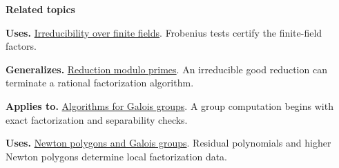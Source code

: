 \documentclass[11pt,a4paper,oneside,openany]{book}
\begin{document}
\par\medskip\begingroup\footnotesize\setlength{\parskip}{1pt}\textbf{\sffamily\color{atlasgreen}Related topics}\par
\color{black}\textbf{Uses.} \hyperlink{article:finite-field-irreducibility}{Irreducibility over finite fields}. Frobenius tests certify the finite-field factors.\par
\color{black}\textbf{Generalizes.} \hyperlink{article:modular-irreducibility}{Reduction modulo primes}. An irreducible good reduction can terminate a rational factorization algorithm.\par
\color{black}\textbf{Applies to.} \hyperlink{article:galois-computation}{Algorithms for Galois groups}. A group computation begins with exact factorization and separability checks.\par
\color{black}\textbf{Uses.} \hyperlink{article:newton-polygons}{Newton polygons and Galois groups}. Residual polynomials and higher Newton polygons determine local factorization data.\par
\endgroup
\end{document}
